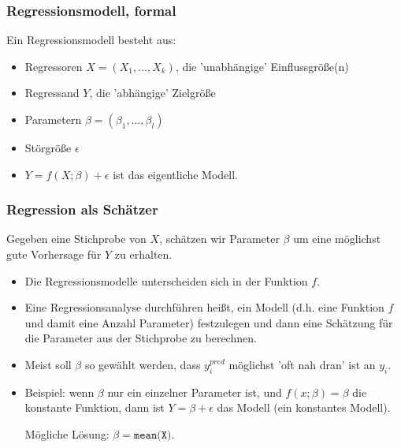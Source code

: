 \begin{frame}
\frametitle{Regressionsmodell, formal}
  Ein \alert{Regressionsmodell} besteht aus:
  \begin{itemize}
  \item \alert{Regressoren} $X = (X_1,\dots,X_k)$, die 'unabhängige' Einflussgröße(n)
  \item \alert{Regressand} $Y$, die 'abhängige' Zielgröße
  \item \alert{Parametern} $\beta = (\beta_1,\dots,\beta_l)$
  \item \alert{Störgröße} $\epsilon$
  \item $Y = f(X; \beta) + \epsilon$ ist das eigentliche \alert{Modell}.
 \end{itemize}
  

\end{frame}

\begin{frame}
\frametitle{Regression als Schätzer}
Gegeben eine Stichprobe von $X$, schätzen wir Parameter $\beta$ um eine möglichst gute Vorhersage für $Y$ zu erhalten.

\begin{itemize}
\item Die Regressionsmodelle unterscheiden sich in der Funktion $f$.
\item Eine \alert{Regressionsanalyse durchführen} heißt, ein Modell (d.h. eine Funktion $f$ und damit eine Anzahl Parameter) festzulegen und dann eine Schätzung für die Parameter aus der Stichprobe zu berechnen.
\item Meist soll $\beta$ so gewählt werden, dass $y_i^{pred}$ möglichst 'oft nah dran' ist an $y_i$.
\item <2->{
    Beispiel: wenn $\beta$ nur ein einzelner Parameter ist, und $f(x;\beta) = \beta$ die konstante Funktion,
    dann ist $Y = \beta + \epsilon$ das Modell (ein konstantes Modell).

    Mögliche Lösung: $\beta = \texttt{mean(X)}$.
  }
\end{itemize}
\end{frame}

